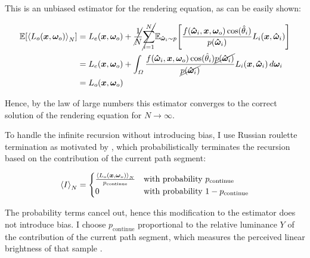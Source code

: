 This is an unbiased estimator for the rendering equation, as can be easily shown:

\begin{equation}
\begin{aligned}
    \expectation{\estimator{L_o(\vec{x}, \vec{\omega}_o)}}
    &= L_e(\vec{x}, \vec{\omega}_o) + \cancel{\frac{1}{N}} \cancel{\sum_{i=1}^{N}} \expectationvar{\vec{\hat{\omega}}_i \sim p}{\frac{f(\vec{\hat{\omega}}_i, \vec{x}, \vec{\omega}_o) \cos(\hat{\theta}_i)}{p(\vec{\hat{\omega}}_i)} L_i(\vec{x}, \vec{\hat{\omega}}_i)} \\
    &= L_e(\vec{x}, \vec{\omega}_o) + \int_{\Omega} \frac{f(\vec{\hat{\omega}}_i, \vec{x}, \vec{\omega}_o) \cos(\hat{\theta}_i) \cancel{p(\vec{\hat{\omega}}_i)}}{\cancel{p(\vec{\hat{\omega}}_i)}} L_i(\vec{x}, \vec{\hat{\omega}}_i) \diff\vec{\omega}_i \\
    &= L_o(\vec{x}, \vec{\omega}_o)
\end{aligned}
\end{equation}

Hence, by the law of large numbers this estimator converges to the correct solution of the rendering equation for $N \to \infty$.

To handle the infinite recursion without introducing bias, I use Russian roulette termination as motivated by \textcite{veach1997}, which probabilistically terminates the recursion based on the contribution of the current path segment:

\begin{equation}
    \estimator{I} =
    \begin{cases}
        \frac{\estimator{L_o(\vec{x}, \vec{\omega}_o)}}{p_\mathrm{continue}} & \text{with probability } p_\mathrm{continue} \\
        0 & \text{with probability } 1 - p_\mathrm{continue}
    \end{cases}
\end{equation}

The probability terms cancel out, hence this modification to the estimator does not introduce bias.
I choose $p_\mathrm{continue}$ proportional to the relative luminance $Y$ of the contribution of the current path segment, which measures the perceived linear brightness of that sample .




